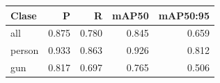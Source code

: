 \begin{tabular}{lrrrr}
\toprule
Clase & P & R & mAP50 & mAP50:95 \\
\midrule
all & 0.875 & 0.780 & 0.845 & 0.659 \\
person & 0.933 & 0.863 & 0.926 & 0.812 \\
gun & 0.817 & 0.697 & 0.765 & 0.506 \\
\bottomrule
\end{tabular}
